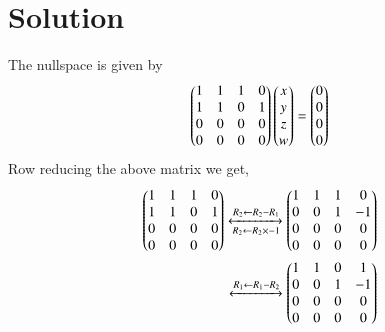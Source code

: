\documentclass[journal,12pt,twocolumn]{IEEEtran}
\begin{document}
\section{Solution}
The nullspace is given by 
\begin{align}
	\begin{pmatrix}1 & 1 & 1 & 0 \\ 1 & 1 & 0 & 1\\ 0 & 0 & 0 & 0\\0 & 0 & 0 & 0\end{pmatrix}\begin{pmatrix}x\\y\\z\\w\end{pmatrix} = \begin{pmatrix}0 \\ 0 \\ 0 \\ 0\end{pmatrix}
\end{align}	
Row reducing the above matrix we get,
\begin{align}
	\begin{pmatrix}1 & 1 & 1 & 0 \\ 1 & 1 & 0 & 1\\ 0 & 0 & 0 & 0\\0 & 0 & 0 & 0\end{pmatrix}
	\xleftrightarrow[R_2 \leftarrow R_2 \times -1]{R_2 \leftarrow R_2 - R_1}
	\begin{pmatrix}1 & 1 & 1 & 0 \\ 0 & 0 & 1 & -1\\ 0 & 0 & 0 & 0\\0 & 0 & 0 & 0\end{pmatrix}\\
	\xleftrightarrow{R_1 \leftarrow R_1- R_2}
	\begin{pmatrix}1 & 1 & 0 & 1 \\ 0 & 0 & 1 & -1\\ 0 & 0 & 0 & 0\\0 & 0 & 0 & 0\end{pmatrix} \label{eq:rref}
\end{align}
\end{document}
